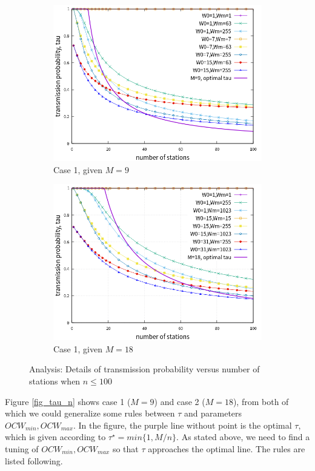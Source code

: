 \begin{figure}[!h]
\centering
\begin{subfigure}{\textwidth}
\centering
\includegraphics[scale=.85]{./figure/chp4/M9/n_tau_perf_M9_x100.png}
\caption{Case 1, given $M=9$}
\label{fig_tau_n_M9_detail}
\end{subfigure}

\begin{subfigure}{\textwidth}
\centering
\includegraphics[scale=.85]{./figure/chp4/M18/n_tau_perf_M18_x100.png}
\caption{Case 1, given $M=18$}
\label{fig_tau_n_M18_detail}
\end{subfigure}

\caption{Analysis: Details of transmission probability versus number of stations when $n\leq 100$}
\label{fig_tau_n_detail}
\end{figure}
Figure \ref{fig_tau_n} shows case 1 ($M=9$) and case 2 ($M=18$), from both of which we could generalize some rules between $\tau$ and parameters $OCW_{min}, OCW_{max}$.
In the figure, the purple line without point is the optimal $\tau$, which is given according to $\tau^\star = min\lbrace 1, M/n \rbrace$.
As stated above, we need to find a tuning of $OCW_{min}, OCW_{max}$ so that $\tau$ approaches the optimal line. The rules are listed following.

